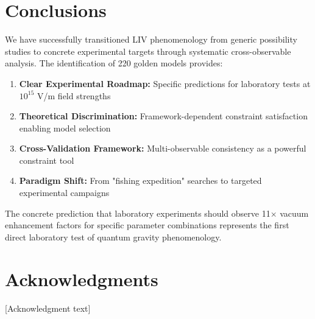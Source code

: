\documentclass[12pt]{article}
\begin{document}
\section{Conclusions}

We have successfully transitioned LIV phenomenology from generic possibility studies to concrete experimental targets through systematic cross-observable analysis. The identification of 220 golden models provides:

\begin{enumerate}
\item \textbf{Clear Experimental Roadmap:} Specific predictions for laboratory tests at $10^{15}$ V/m field strengths

\item \textbf{Theoretical Discrimination:} Framework-dependent constraint satisfaction enabling model selection

\item \textbf{Cross-Validation Framework:} Multi-observable consistency as a powerful constraint tool

\item \textbf{Paradigm Shift:} From "fishing expedition" searches to targeted experimental campaigns
\end{enumerate}

The concrete prediction that laboratory experiments should observe 11$\times$ vacuum enhancement factors for specific parameter combinations represents the first direct laboratory test of quantum gravity phenomenology.

\section*{Acknowledgments}

[Acknowledgment text]



\end{document}

